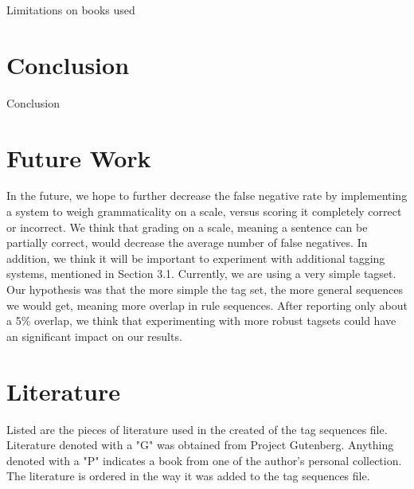 \documentclass[11pt,a4paper]{article}
\begin{document}
\begin{multicols}{2}
Limitations on books used\\

\section{Conclusion}
Conclusion

\section{Future Work}
In the future, we hope to further decrease the false negative rate by implementing a system to weigh grammaticality on a scale, versus scoring it completely correct or incorrect. We think that grading on a scale, meaning a sentence can be partially correct, would decrease the average number of false negatives. In addition, we think it will be important to experiment with additional tagging systems, mentioned in Section 3.1. Currently, we are using a very simple tagset. Our hypothesis was that the more simple the tag set, the more general sequences we would get, meaning more overlap in rule sequences. After reporting only about a 5\% overlap, we think that experimenting with more robust tagsets could have an significant impact on our results.

\newpage




\end{multicols}

\pagebreak

\appendix
\appendixpage

\section{Literature}
Listed are the pieces of literature used in the created of the tag sequences file. Literature denoted with a "G" was obtained from Project Gutenberg. Anything denoted with a "P" indicates a book from one of the author's personal collection. The literature is ordered in the way it was added to the tag sequences file.
\end{document}
